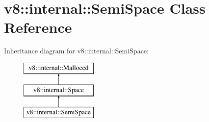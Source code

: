 \hypertarget{classv8_1_1internal_1_1_semi_space}{}\section{v8\+:\+:internal\+:\+:Semi\+Space Class Reference}
\label{classv8_1_1internal_1_1_semi_space}
Inheritance diagram for v8\+:\+:internal\+:\+:Semi\+Space\+:\begin{figure}[H]
\begin{center}
\leavevmode
\includegraphics[height=3.000000cm]{classv8_1_1internal_1_1_semi_space}
\end{center}
\end{figure}
